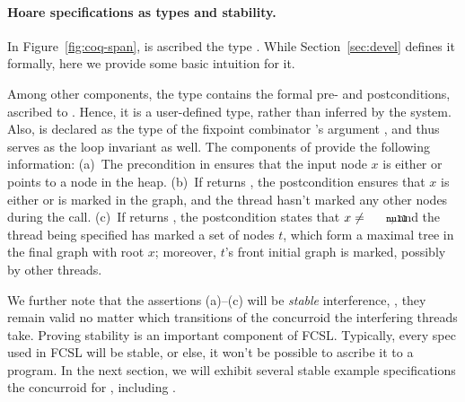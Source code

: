 \paragraph{Hoare specifications as types and stability.~~}
\label{sec:semi-formal-spec}
%
In Figure~\ref{fig:coq-span},  is ascribed the type
. While Section~\ref{sec:devel} defines it formally,
here we provide some basic intuition for it.

Among other components, the type  contains the formal
pre- and postconditions, ascribed to . Hence, it is a
user-defined type, rather than inferred by the system. Also,
 is declared as the type of the fixpoint combinator
's argument , and thus serves as the loop
invariant as well. The components of  provide the
following information:
%
(a)~The precondition in  ensures that the input node
$x$ is either  or points to a node in the heap.
%
(b)~If  returns , the postcondition ensures
that $x$ is either  or is marked in the graph, and the
thread hasn't marked any other nodes during the call.
%
(c)~If  returns , the postcondition states that
$x \neq \text{\code{null}}$, and the thread being specified has marked
a set of nodes $t$, which form a maximal tree in the final graph with
root $x$; moreover, $t$'s front \wrt initial graph is marked, possibly
by other threads.
%

We further note that the assertions (a)--(c) will be \emph{stable}
\wrt interference, \ie, they remain valid no matter which transitions
of the  concurroid the interfering threads take. 
%
%
Proving stability is an important component of FCSL. Typically, every
spec used in FCSL will be stable, or else, it won't be possible to
ascribe it to a program. In the next section, we will exhibit several
stable example specifications \wrt the concurroid for ,
including .


